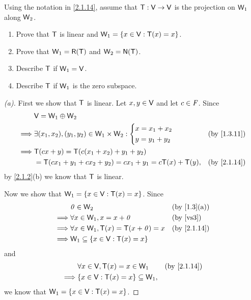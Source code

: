 \setcounter{ex}{25}
\begin{ex}\label{ex:2.1.26}
  Using the notation in \cref{2.1.14}, assume that \(\mathsf{T} : \mathsf{V} \to \mathsf{V}\) is the projection on \(\mathsf{W}_1\) along \(\mathsf{W}_2\).
  \begin{enumerate}
    \item Prove that \(\mathsf{T}\) is linear and \(\mathsf{W}_1 = \left\lbrace x \in \mathsf{V} : \mathsf{T}(x) = x\right\rbrace\).
    \item Prove that \(\W_1 = \rg{\T}\) and \(\W_2 = \ns{\T}\).
    \item Describe \(\mathsf{T}\) if \(\mathsf{W}_1 = \mathsf{V}\).
    \item Describe \(\mathsf{T}\) if \(\mathsf{W}_1\) is the zero subspace.
  \end{enumerate}
\end{ex}

\begin{proof}[(a)]
  First we show that \(\mathsf{T}\) is linear.
  Let \(x, y \in \mathsf{V}\) and let \(c \in \mathit{F}\).
  Since
  \begin{align*}
             & \V = \W_1 \oplus \W_2                                                                 \\
    \implies & \exists (x_1, x_2), (y_1, y_2) \in \W_1 \times \W_2 : \begin{dcases}
                                                                       x = x_1 + x_2 \\
                                                                       y = y_1 + y_2
                                                                     \end{dcases} &  & \by{1.3.11}   \\
    \implies & \T(cx + y) = \T(c (x_1 + x_2) + y_1 + y_2)                                            \\
             & = \T(c x_1 + y_1 + c x_2 + y_2) = c x_1 + y_1 = c \T(x) + \T(y),     &  & \by{2.1.14}
  \end{align*}
  by \cref{2.1.2}(b) we know that \(\mathsf{T}\) is linear.

  Now we show that \(\mathsf{W}_1 = \left\lbrace x \in \mathsf{V} : \mathsf{T}(x) = x\right\rbrace\).
  Since
  \begin{align*}
             & \zv \in \W_2                                &  & \by{1.3}[a]           \\
    \implies & \forall x \in \W_1, x = x + \zv             &  & \text{(by \ref{vs3})} \\
    \implies & \forall x \in \W_1, \T(x) = \T(x + \zv) = x &  & \by{2.1.14}           \\
    \implies & \W_1 \subseteq \set{x \in \V : \T(x) = x}
  \end{align*}
  and
  \begin{align*}
             & \forall x \in \V, \T(x) = x \in \W_1       &  & \by{2.1.14} \\
    \implies & \set{x \in \V : \T(x) = x} \subseteq \W_1,
  \end{align*}
  we know that \(\mathsf{W}_1 = \left\lbrace x \in \mathsf{V} : \mathsf{T}(x) = x\right\rbrace\).
\end{proof}

